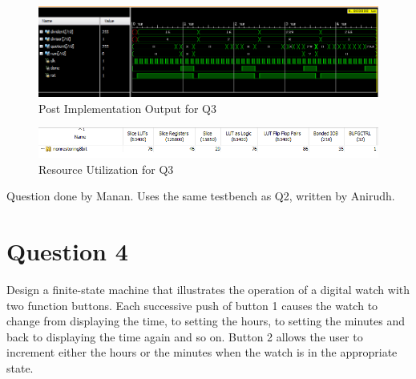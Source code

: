 \documentclass[11pt,a4paper]{article}
\begin{document}
	 
	 \begin{figure}[H]
	 	\centering
	 	\includegraphics[width=1\linewidth]{images/q3output}
	 	\caption[]{Post Implementation Output for Q3}
	 	\label{fig:q3output}
	 \end{figure}
	 \begin{figure}[H]
	 	\centering
	 	\includegraphics[width=1\linewidth]{images/q3utilization}
	 	\caption[]{Resource Utilization for Q3}
	 	\label{fig:q3utilization}
	 \end{figure}
 	Question done by Manan. Uses the same testbench as Q2, written by Anirudh.
 	\section*{Question 4}
 	Design a finite-state machine that illustrates the operation of a digital watch with two function buttons. Each successive push of button 1 causes the watch to change from displaying the time, to setting the hours, to setting the minutes and back to displaying the time again and so on. Button 2 allows the user to increment either the hours or the minutes when the watch is in the appropriate state.
 	
\end{document}
